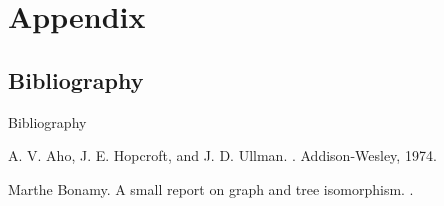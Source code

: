 \section*{Appendix}
\subsection*{Bibliography}
\begin{frame}{Bibliography}
    
  \begin{thebibliography}{10}
    
  \beamertemplatebookbibitems

    A. V. Aho, J. E. Hopcroft, and J. D. Ullman. 
    .
    \newblock Addison-Wesley, 1974.
    
  \beamertemplatearticlebibitems
    Marthe Bonamy.
    \newblock A small report on graph and tree isomorphism.
    .
    
  \end{thebibliography}
\end{frame}



